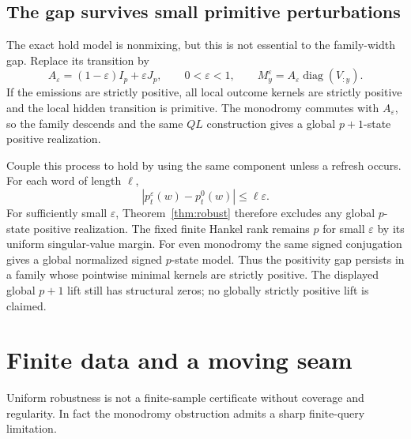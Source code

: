 \documentclass[11pt]{article}
\theoremstyle{definition}\newtheorem{definition}[theorem]{Definition}
\theoremstyle{remark}\newtheorem{remark}[theorem]{Remark}
\newcommand{\diag}{\operatorname{diag}}
\newcommand{\eps}{\varepsilon}
\begin{document}
\subsection{The gap survives small primitive perturbations}
The exact hold model is nonmixing, but this is not essential to the family-width gap. Replace its transition by
\[
 A_\eps=(1-\eps)I_p+\eps J_p,\qquad 0<\eps<1,
 \qquad M_y^{\eps}=A_\eps\diag(V_{:y}).
\]
If the emissions are strictly positive, all local outcome kernels are strictly positive and the local hidden transition is primitive. The monodromy commutes with $A_\eps$, so the family descends and the same $QL$ construction gives a global $p+1$-state positive realization.

Couple this process to hold by using the same component unless a refresh occurs. For each word of length $\ell$,
\[
 |p_t^{\eps}(w)-p_t^0(w)|\leq \ell\eps.
\]
For sufficiently small $\eps$, Theorem~\ref{thm:robust} therefore excludes any global $p$-state positive realization. The fixed finite Hankel rank remains $p$ for small $\eps$ by its uniform singular-value margin. For even monodromy the same signed conjugation gives a global normalized signed $p$-state model. Thus the positivity gap persists in a family whose pointwise minimal kernels are strictly positive. The displayed global $p+1$ lift still has structural zeros; no globally strictly positive lift is claimed.

\section{Finite data and a moving seam}
Uniform robustness is not a finite-sample certificate without coverage and regularity. In fact the monodromy obstruction admits a sharp finite-query limitation.
\end{document}
